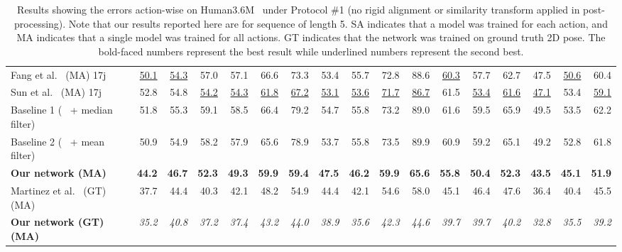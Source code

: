 \documentclass[runningheads]{llncs}
\begin{document}
\begin{table}
{\begin{tabular}{@{}lrrrrrrrrrrrrrrrr@{}}
Fang et al.~\cite{fang2017learning} (MA) 17j  & \underline{50.1} & \underline{54.3} & 57.0 & 57.1 & 66.6 & 73.3 & 53.4 & 55.7 & 72.8 & 88.6 & \underline{60.3} & 57.7 & 62.7 & 47.5 & \underline{50.6} & 60.4\\
Sun et al.~\cite{sun2017compositional} (MA) 17j  & 52.8 & 54.8 & \underline{54.2} &\underline {54.3} & \underline{61.8} & \underline{67.2} & \underline{53.1} & \underline{53.6} & \underline{71.7} & \underline{86.7} & 61.5 & \underline{53.4} & \underline{61.6}  & \underline{47.1} & 53.4 & \underline{59.1}\\
\hline
Baseline 1 (~\cite{JMartinez:ICCV:2017} + median filter)  & 51.8& 	55.3& 	59.1& 	58.5& 	66.4& 	79.2& 	54.7& 	55.8& 	73.2& 	89.0& 	61.6& 	59.5& 	65.9& 	49.5& 	53.5& 	62.2\\
Baseline 2 (~\cite{JMartinez:ICCV:2017} + mean filter)  & 50.9 &  54.9& 58.2 &	57.9& 65.6 &	78.9&	53.7&	55.8&	73.5&	89.9& 60.9 & 59.2 &	65.1& 49.2 &	52.8& 61.8 \\ 
\textbf{Our network (MA)} & \bf{44.2}&  \bf{46.7}&	\bf{52.3}&	\bf{49.3}&	\bf{59.9}&	\bf{59.4}&	\bf{47.5}&	\bf{46.2}&	\bf{59.9}&	\bf{65.6}&	\bf{55.8}&	\bf{50.4}&	\bf{52.3}&	\bf{43.5}&	\bf{45.1}&	\bf{51.9}\\

\hline
Martinez et al.~\cite{JMartinez:ICCV:2017} (GT) (MA) & 37.7& 	44.4& 	40.3& 	42.1& 	48.2& 	54.9& 	44.4& 	42.1& 	54.6& 	58.0& 	45.1& 	46.4& 	47.6& 	36.4& 	40.4& 	45.5\\
\textbf{Our network (GT) (MA)} & \it{35.2}&  \it{40.8}&	\it{37.2}&	\it{37.4}&	\it{43.2}&	\it{44.0}&	\it{38.9}&	\it{35.6}&	\it{42.3}&	\it{44.6}&	\it{39.7}&	\it{39.7}&	\it{40.2}&	\it{32.8}&	\it{35.5}&	\it{39.2}\\
\hline
\end{tabular}}
\vspace{3mm}
\caption{Results showing the errors action-wise on Human3.6M~\cite{h36m_pami} under Protocol \#1 (no rigid alignment or similarity transform applied in post-processing). Note that our results reported here are for sequence of length 5. SA indicates that a model was trained for each action, and MA indicates that a single model was trained for all actions. GT indicates that the network was trained on ground truth 2D pose. The bold-faced numbers represent the best result while underlined numbers represent the second best.}
\label{tab:protocol_1}
\vspace{-5mm}
\end{table}
\end{document}
